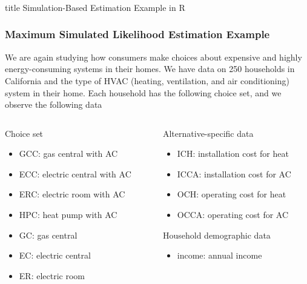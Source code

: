 \documentclass{beamer}
\begin{document}
\begin{frame}\frametitle{}
    \vfill
    \centering
    \begin{beamercolorbox}[center]{title}
        \Large Simulation-Based Estimation Example in R
    \end{beamercolorbox}
    \vfill
\end{frame}

\begin{frame}\frametitle{Maximum Simulated Likelihood Estimation Example}
    We are again studying how consumers make choices about expensive and highly energy-consuming systems in their homes. We have data on 250 households in California and the type of HVAC (heating, ventilation, and air conditioning) system in their home. Each household has the following choice set, and we observe the following data \\
    \vspace{3ex}
    \begin{columns}
    	\begin{column}{0.5\textwidth}
		    Choice set
		    \begin{itemize}
		    	\item GCC: gas central with AC
		    	\item ECC: electric central with AC
		    	\item ERC: electric room with AC
		    	\item HPC: heat pump with AC
		    	\item GC: gas central
		    	\item EC: electric central
		    	\item ER: electric room
		    \end{itemize}
		    \vspace{2ex}
	    \end{column}
	    \begin{column}{0.5\textwidth}
		    Alternative-specific data
		    \begin{itemize}
		    	\item ICH: installation cost for heat
		    	\item ICCA: installation cost for AC
		    	\item OCH: operating cost for heat
		    	\item OCCA: operating cost for AC
		    \end{itemize}
		    \vspace{2ex}
		    Household demographic data
		    \begin{itemize}
		    	\item income: annual income
		    \end{itemize}
		\end{column}
    \end{columns}
\end{frame}
\end{document}
